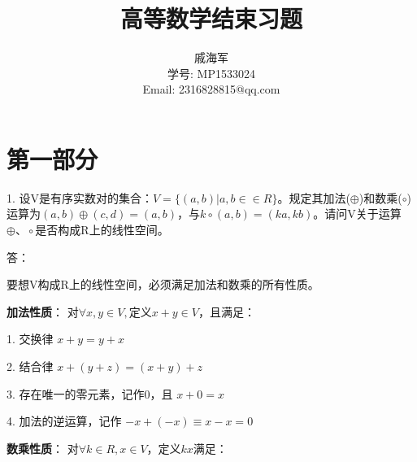 \documentclass[a4paper, 12pt]{article}
\title{高等数学结束习题}
\author{戚海军 \\学号: MP1533024 \\Email: 2316828815@qq.com}
\date{}
\begin{document}
\maketitle

\section{第一部分}
1. 设V是有序实数对的集合：\begin{math}V = \{(a, b) | a, b\in∈R\}\end{math}。规定其加法(\begin{math}\oplus\end{math})和数乘(\begin{math}\circ\end{math})运算为\begin{math}(a, b)\oplus(c, d) = (a, b)\end{math}，与\begin{math}k\circ(a, b) = (ka, kb)\end{math}。请问V关于运算\begin{math}\oplus、\circ\end{math}是否构成R上的线性空间。

答：

要想V构成R上的线性空间，必须满足加法和数乘的所有性质。
	
\textbf{加法性质}：
对\begin{math}\forall x,y\in V,定义x+y\in V\end{math}，且满足：
	
1. 交换律	\begin{math}x + y = y + x\end{math}
	
2. 结合律 \begin{math}x + (y + z) = (x + y) + z\end{math}
	
3. 存在唯一的零元素，记作0，且
\begin{math}x + 0 = x\end{math}
		
4. 加法的逆运算，记作
\begin{math}-x + (-x) \equiv x - x = 0\end{math}
		
\textbf{数乘性质}：
对\begin{math}\forall k\in R, x\in V\end{math}，定义\begin{math}kx\end{math}满足：
	
\end{document}
